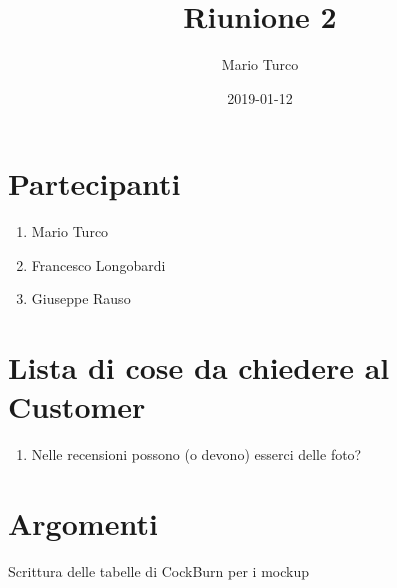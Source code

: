 \documentclass{article}
\title{Riunione 2}
\date{2019-01-12}
\author{Mario Turco}
\begin{document}
\maketitle
{}
\newpage
{}
\section{Partecipanti}
\begin{enumerate}
    \item Mario Turco
    \item Francesco Longobardi  
    \item Giuseppe Rauso
\end{enumerate}
\section{Lista di cose da chiedere al Customer}
\begin{enumerate}
    \item Nelle recensioni possono (o devono) esserci delle foto?
\end{enumerate}
\newpage
\section{Argomenti}
Scrittura delle tabelle di CockBurn per i mockup

 
\end{document}
